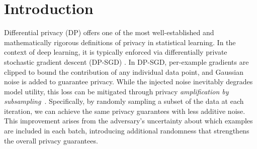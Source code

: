 \documentclass{article}
\theoremstyle{plain}
\theoremstyle{definition}
\theoremstyle{remark}
\renewcommand{\epsilon}{\varepsilon}
\begin{document}
\printAffiliationsAndNotice{}  %

\begin{abstract}
 We study privacy amplification for differentially private model training with matrix factorization under random allocation (also known as the balls-in-bins model). Recent work by Choquette-Choo et al. (2025) proposes a sampling-based Monte Carlo  approach to compute amplification parameters in this setting.
 However, their guarantees either only hold with some high probability or require random abstention by the mechanism.
 Furthermore, the required number of samples for ensuring $(\epsilon,\delta)$-DP is inversely proportional to $\delta$.
 In contrast, we develop sampling-free bounds based on Rényi divergence and conditional composition. 
 The former
 is facilitated by a dynamic programming formulation to efficiently compute the bounds. 
 The latter complements it by offering stronger privacy guarantees for small $\epsilon$, where R\'enyi divergence bounds inherently lead to an over-approximation.
 Our framework applies to arbitrary banded and non-banded matrices. Through numerical comparisons, we demonstrate the efficacy of our approach across a broad range of matrix mechanisms used in research and practice.
\end{abstract}

\section{Introduction}

Differential privacy (DP) \citep{dwork2006differential} offers one of the most well-established and mathematically rigorous definitions of privacy in statistical learning. In the context of deep learning, it is typically enforced via differentially private stochastic gradient descent (DP-SGD) \citep{abadi2016deep}. In DP-SGD, per-example gradients are clipped to bound the contribution of any individual data point, and Gaussian noise is added to guarantee privacy. While the injected noise inevitably degrades model utility, this loss can be mitigated through privacy \textit{amplification by subsampling}~\cite{li2012sampling}. Specifically, by randomly sampling a subset of the data at each iteration, we can achieve the same privacy guarantees with less additive noise. This improvement arises from the adversary’s uncertainty about which examples are included in each batch, introducing additional randomness that strengthens the overall privacy guarantees.
\end{document}
